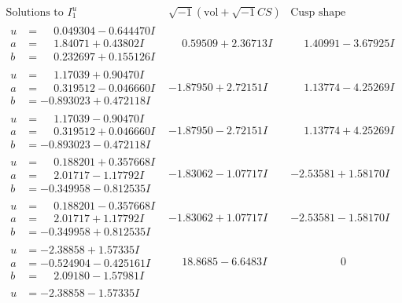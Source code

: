 \documentclass[1p]{elsarticle_modified}
\theoremstyle{definition}
\newcommand{\I}{\sqrt{-1}}
\begin{document}
$$\begin{array}{c|c|c}
\text{Solutions to }I^u_{1}& \I (\text{vol} + \sqrt{-1}CS) & \text{Cusp shape}\\
 \hline 
\begin{aligned}
u &= \phantom{-}0.049304 - 0.644470 I \\
a &= \phantom{-}1.84071 + 0.43802 I \\
b &= \phantom{-}0.232697 + 0.155126 I\end{aligned}
 & \phantom{-}0.59509 + 2.36713 I & \phantom{-}1.40991 - 3.67925 I \\ \hline\begin{aligned}
u &= \phantom{-}1.17039 + 0.90470 I \\
a &= \phantom{-}0.319512 - 0.046660 I \\
b &= -0.893023 + 0.472118 I\end{aligned}
 & -1.87950 + 2.72151 I & \phantom{-}1.13774 - 4.25269 I \\ \hline\begin{aligned}
u &= \phantom{-}1.17039 - 0.90470 I \\
a &= \phantom{-}0.319512 + 0.046660 I \\
b &= -0.893023 - 0.472118 I\end{aligned}
 & -1.87950 - 2.72151 I & \phantom{-}1.13774 + 4.25269 I \\ \hline\begin{aligned}
u &= \phantom{-}0.188201 + 0.357668 I \\
a &= \phantom{-}2.01717 - 1.17792 I \\
b &= -0.349958 - 0.812535 I\end{aligned}
 & -1.83062 - 1.07717 I & -2.53581 + 1.58170 I \\ \hline\begin{aligned}
u &= \phantom{-}0.188201 - 0.357668 I \\
a &= \phantom{-}2.01717 + 1.17792 I \\
b &= -0.349958 + 0.812535 I\end{aligned}
 & -1.83062 + 1.07717 I & -2.53581 - 1.58170 I \\ \hline\begin{aligned}
u &= -2.38858 + 1.57335 I \\
a &= -0.524904 - 0.425161 I \\
b &= \phantom{-}2.09180 - 1.57981 I\end{aligned}
 & \phantom{-}18.8685 - 6.6483 I & \phantom{-0.000000 } 0 \\ \hline\begin{aligned}
u &= -2.38858 - 1.57335 I \\

\end{aligned}
\end{array}$$
\end{document}

